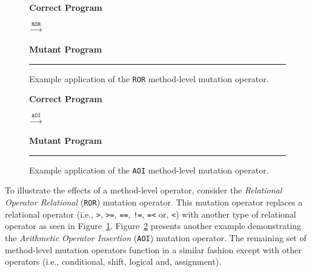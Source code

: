 \begin{figure}[ht!]
  \centering
  \begin{minipage}{6.5cm}
  \centering
  \footnotesize{\textbf{Correct Program}}
  
  \end{minipage}
  $\xrightarrow{\texttt{ROR}}$
  \begin{minipage}{6.5cm}
  \centering
  \footnotesize{\textbf{Mutant Program}}
  
  \end{minipage}
  \caption{Example application of the \texttt{ROR} method-level mutation operator.}
  \vspace{2mm}
  \hrule
  \label{fig:ROR_mutation}
\end{figure}

\begin{figure}[ht!]
  \centering
  \begin{minipage}{6.5cm}
  \centering
  \footnotesize{\textbf{Correct Program}}
  
  \end{minipage}
  $\xrightarrow{\texttt{AOI}}$
  \begin{minipage}{6.5cm}
  \centering
  \footnotesize{\textbf{Mutant Program}}
  
  \end{minipage}
  \caption{Example application of the \texttt{AOI} method-level mutation operator.}
  \vspace{2mm}
  \hrule
  \label{fig:AOI_mutation}
\end{figure}

To illustrate the effects of a method-level operator, consider the \emph{Relational Operator Relational} (\texttt{ROR}) mutation operator. This mutation operator replaces a relational operator (i.e., \texttt{>}, \texttt{>=}, \texttt{==}, \texttt{!=}, \texttt{=<} or, \texttt{<}) with another type of relational operator as seen in Figure~\ref{fig:ROR_mutation}. Figure~\ref{fig:AOI_mutation} presents another example demonstrating the \emph{Arithmetic Operator Insertion} (\texttt{AOI}) mutation operator. The remaining set of method-level mutation operators function in a similar fashion except with other operators (i.e., conditional, shift, logical and, assignment).


